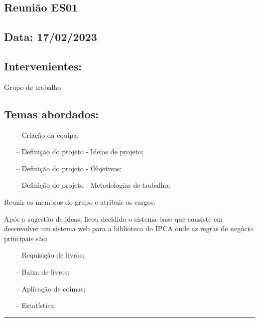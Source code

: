 \subsection{Reunião ES01}\label{reuniaoES01}

\subsection*{Data: 17/02/2023}


\subsection*{Intervenientes:}
Grupo de trabalho

\subsection*{Temas abordados:}
\begin{itemize}
\item[--] Criação da equipa;
\item[--] Definição do projeto - Ideias de projeto;
\item[--] Definição do projeto - Objetivos;
\item[--] Definição do projeto - Metodologias de trabalho;
\end{itemize}

\noindent Reunir os membros do grupo e atribuir os cargos.

\noindent Após a sugestão de ideas, ficou decidido o sistema base que consiste em desenvolver um sistema web para a biblioteca do IPCA onde as regras de negócio principais são:

\begin{itemize}
\item[--] Requisição de livros;
\item[--] Baixa de livros;
\item[--] Aplicação de coimas;
\item[--] Estatística;
\end{itemize}

\noindent \rule{\linewidth}{0.4pt}
\newline

